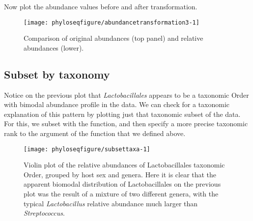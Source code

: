 Now plot the abundance values before and after transformation.

\begin{figure}[H]
\begin{knitrout}
\color{fgcolor}\begin{kframe}
\begin{alltt}
 \hlkwb{=} \hlstd{)}
 \hlkwb{=} \hlstd{)}
\hlstd{(} \hlstd{=} 
\end{alltt}
\end{kframe}

{\centering \texttt{[image: phyloseqfigure/abundancetransformation3-1]} 

}



\end{knitrout}
\caption{
Comparison of original abundances (top panel)
and relative abundances (lower).
}
\end{figure}


\subsection*{Subset by taxonomy}

Notice on the previous plot that
\emph{Lactobacillales} appears to be a taxonomic Order
with bimodal abundance profile in the data.
We can check for a taxonomic explanation of this pattern
by plotting just that taxonomic subset of the data.
For this, we subset with the  function,
and then specify a more precise taxonomic rank
to the  argument of the  function
that we defined above.

\begin{figure}[H]
\begin{knitrout}
\color{fgcolor}\begin{kframe}
\begin{alltt}
 \hlkwb{=}  \hlopt{==} \hlstd{)}
  \hlstd{=} \hlstd{,}  \hlstd{=} \hlstd{)}
\end{alltt}
\end{kframe}

{\centering \texttt{[image: phyloseqfigure/subsettaxa-1]} 

}



\end{knitrout}
\caption{Violin plot of the relative abundances of Lactobacillales taxonomic Order,
grouped by host sex and genera.
Here it is clear that the apparent biomodal distribution
of Lactobacillales on the previous plot
was the result of a mixture of two different genera,
with the typical \emph{Lactobacillus} relative abundance
much larger than \emph{Streptococcus}.}
\end{figure}

